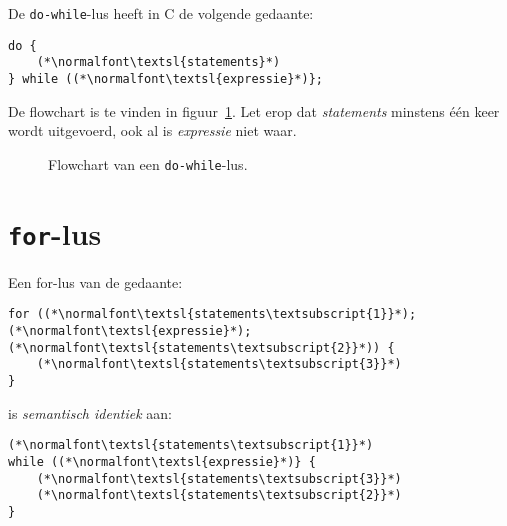 De \texttt{do-while}-lus heeft in C de volgende gedaante:

\begin{lstlisting}[caption=Do-while-lus in C.]
do {
    (*\normalfont\textsl{statements}*)
} while ((*\normalfont\textsl{expressie}*)};
\end{lstlisting}

De flowchart is te vinden in figuur~\ref{fig:flodowhile}.
Let erop dat \textsl{statements} minstens \'e\'en keer wordt uitgevoerd, ook al is \textsl{expressie}
niet waar.

\begin{figure}[!ht]
\centering
{}
\caption{Flowchart van een \texttt{do-while}-lus.}
\label{fig:flodowhile}
\end{figure}


\newpage
\section{\texttt{for}-lus}

Een for-lus van de gedaante:
%
\begin{lstlisting}[caption=For-lus in C.]
for ((*\normalfont\textsl{statements\textsubscript{1}}*); (*\normalfont\textsl{expressie}*); (*\normalfont\textsl{statements\textsubscript{2}}*)) {
    (*\normalfont\textsl{statements\textsubscript{3}}*)
}
\end{lstlisting}
%
is \textsl{semantisch identiek} aan:
%
\begin{lstlisting}[caption=For-lus herschreven als while-lus in C.]
(*\normalfont\textsl{statements\textsubscript{1}}*)
while ((*\normalfont\textsl{expressie}*)} {
    (*\normalfont\textsl{statements\textsubscript{3}}*)
    (*\normalfont\textsl{statements\textsubscript{2}}*)
}
\end{lstlisting}

